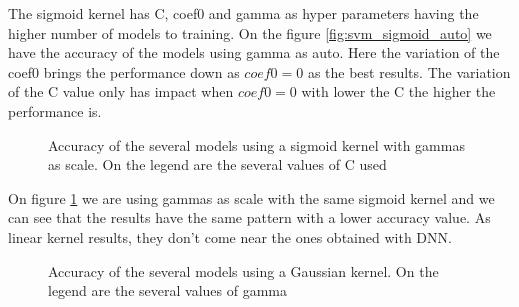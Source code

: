 \documentclass[journal, a4paper]{IEEEtran}
\begin{document}
    The sigmoid kernel has C, coef0 and gamma as hyper parameters having the higher number of models
to training. On the figure \ref{fig:svm_sigmoid_auto} we have the accuracy of the models using
gamma as auto. Here the variation of the coef0 brings the performance down as \(coef0=0\) as the best
results. The variation of the C value only has impact when \(coef0=0\) with lower the C the higher
the performance is.

    \begin{figure}
      \caption{Accuracy of the several models using a sigmoid kernel with gammas as scale. On the legend
      are the several values of C used}
      \label{fig:svm_sigmoid_scale}
    \end{figure}

    On figure \ref{fig:svm_sigmoid_scale} we are using gammas as scale with the same sigmoid kernel and we
can see that the results have the same pattern with a lower accuracy value. As linear kernel results, they
don't come near the ones obtained with DNN.

    \begin{figure}
      \caption{Accuracy of the several models using a Gaussian kernel. On the legend
      are the several values of gamma}
      \label{fig:svm_rbf}
    \end{figure}
\end{document}
